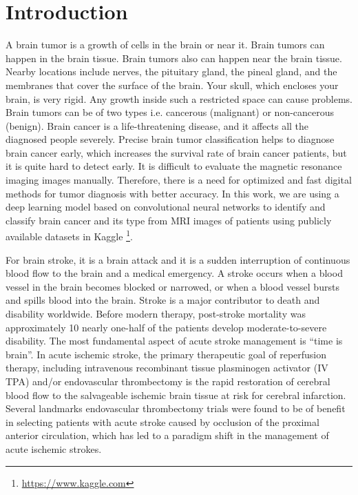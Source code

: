 \chapter{Introduction}

A brain tumor is a growth of cells in the brain or near it. Brain tumors can happen
in the brain tissue. Brain tumors also can happen near the brain tissue. Nearby
locations include nerves, the pituitary gland, the pineal gland, and the membranes
that cover the surface of the brain.
Your skull, which encloses your brain, is very rigid. Any growth inside such a
restricted space can cause problems. Brain tumors can be of two types i.e.
cancerous (malignant) or non-cancerous (benign).
Brain cancer is a life-threatening disease, and it affects all the diagnosed people
severely. Precise brain tumor classification helps to diagnose brain cancer early,
which increases the survival rate of brain cancer patients, but it is quite hard to
detect early. It is difficult to evaluate the magnetic resonance imaging images
manually. Therefore, there is a need for optimized and fast digital methods for
tumor diagnosis with better accuracy.
In this work, we are using a deep learning model based on convolutional neural
networks to identify and classify brain cancer and its type from MRI images of
patients using publicly available datasets in Kaggle \footnote{\url{https://www.kaggle.com}}.

For brain stroke, it is a brain attack and it is a sudden interruption of continuous
blood flow to the brain and a medical emergency. A stroke occurs when a blood
vessel in the brain becomes blocked or narrowed, or when a blood vessel bursts
and spills blood into the brain.
Stroke is a major contributor to death and disability worldwide. Before modern
therapy, post-stroke mortality was approximately 10%
nearly one-half of the patients develop moderate-to-severe disability.
The most fundamental aspect of acute stroke management is “time is brain”. In acute
ischemic stroke, the primary therapeutic goal of reperfusion therapy, including
intravenous recombinant tissue plasminogen activator (IV TPA) and/or
endovascular thrombectomy is the rapid restoration of cerebral blood flow to the
salvageable ischemic brain tissue at risk for cerebral infarction. Several landmarks
endovascular thrombectomy trials were found to be of benefit in selecting patients
with acute stroke caused by occlusion of the proximal anterior circulation, which
has led to a paradigm shift in the management of acute ischemic strokes.

